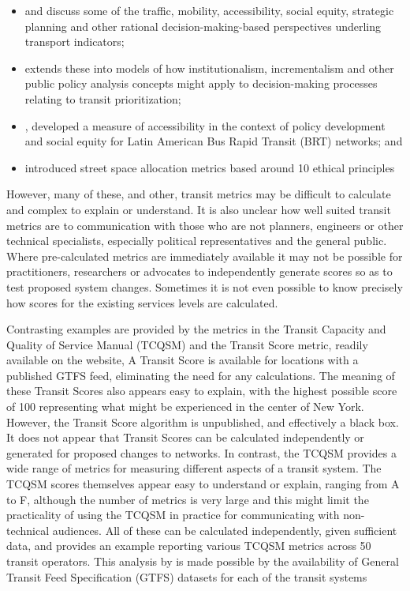 \documentclass[preprint, 3p,
authoryear]{elsarticle} %
\begin{document}
\begin{itemize}
\item
  \citet{Litman:2003ab} and \citet{Litman:2016aa} discuss some of the
  traffic, mobility, accessibility, social equity, strategic planning
  and other rational decision-making-based perspectives underling
  transport indicators;
\item
  \citet{Reynolds:2017ah} extends these into models of how
  institutionalism, incrementalism and other public policy analysis
  concepts might apply to decision-making processes relating to transit
  prioritization;
\item
  \citet{GuzmanLuisA.2017Aeit}, developed a measure of accessibility in
  the context of policy development and social equity for Latin American
  Bus Rapid Transit (BRT) networks; and
\item
  \citet{Creutzig2020streetspaceallocation} introduced street space
  allocation metrics based around 10 ethical principles
\end{itemize}

However, many of these, and other, transit metrics may be difficult to
calculate and complex to explain or understand. It is also unclear how
well suited transit metrics are to communication with those who are not
planners, engineers or other technical specialists, especially political
representatives and the general public. Where pre-calculated metrics are
immediately available it may not be possible for practitioners,
researchers or advocates to independently generate scores so as to test
proposed system changes. Sometimes it is not even possible to know
precisely how scores for the existing services levels are calculated.

Contrasting examples are provided by the metrics in the Transit Capacity
and Quality of Service Manual (TCQSM) and the Transit Score metric,
readily available on the \citet{WalkScore:2023tg} website, A Transit
Score is available for locations with a published GTFS feed, eliminating
the need for any calculations. The meaning of these Transit Scores also
appears easy to explain, with the highest possible score of 100
representing what might be experienced in the center of New York.
However, the Transit Score algorithm is unpublished, and effectively a
black box. It does not appear that Transit Scores can be calculated
independently or generated for proposed changes to networks. In
contrast, the TCQSM provides a wide range of metrics for measuring
different aspects of a transit system. The TCQSM scores themselves
appear easy to understand or explain, ranging from A to F, although the
number of metrics is very large and this might limit the practicality of
using the TCQSM in practice for communicating with non-technical
audiences. All of these can be calculated independently, given
sufficient data, and \citet{Wong:2013aa} provides an example reporting
various TCQSM metrics across 50 transit operators. This analysis by
\citet{Wong:2013aa} is made possible by the availability of General
Transit Feed Specification (GTFS) datasets for each of the transit
systems
\end{document}
